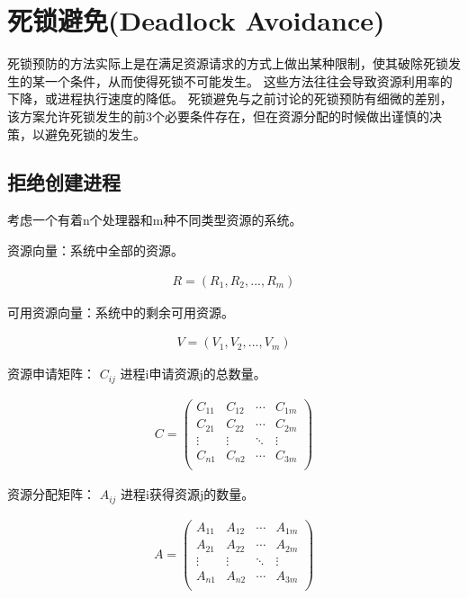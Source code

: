
\section{死锁避免(Deadlock Avoidance)}
{
    死锁预防的方法实际上是在满足资源请求的方式上做出某种限制，使其破除死锁发生的某一个条件，从而使得死锁不可能发生。
    这些方法往往会导致资源利用率的下降，或进程执行速度的降低。
    死锁避免与之前讨论的死锁预防有细微的差别，该方案允许死锁发生的前3个必要条件存在，但在资源分配的时候做出谨慎的决策，以避免死锁的发生。

    \subsection{拒绝创建进程}
    {
        考虑一个有着n个处理器和m种不同类型资源的系统。

        资源向量：系统中全部的资源。

        \begin{align*}
            R = (R_1, R_2, ..., R_m)
        \end{align*}

        可用资源向量：系统中的剩余可用资源。

        \begin{align*}
            V = (V_1, V_2, ..., V_m)
        \end{align*}

        资源申请矩阵： $C_{ij}$  进程i申请资源j的总数量。

        \begin{align*}
            C =
            \begin{pmatrix}
                C_{11} & C_{12} & \cdots & C_{1m} \\
                C_{21} & C_{22} & \cdots & C_{2m} \\
                \vdots & \vdots & \ddots & \vdots \\
                C_{n1} & C_{n2} & \cdots & C_{3m} \\
            \end{pmatrix}
        \end{align*}

        资源分配矩阵： $A_{ij}$ 进程i获得资源j的数量。

        \begin{align*}
            A =
            \begin{pmatrix}
                A_{11} & A_{12} & \cdots & A_{1m} \\
                A_{21} & A_{22} & \cdots & A_{2m} \\
                \vdots & \vdots & \ddots & \vdots \\
                A_{n1} & A_{n2} & \cdots & A_{3m} \\
            \end{pmatrix}
        \end{align*}

}}
